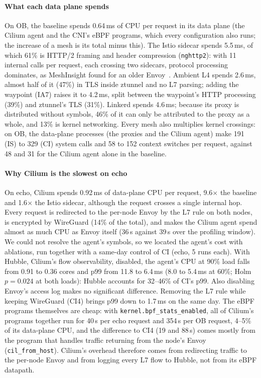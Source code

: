 \paragraph{What each data plane spends}
On OB, the baseline spends 0.64\,ms of CPU per request in its data plane (the
Cilium agent and the CNI's eBPF programs, which every configuration also
runs; the increase of a mesh is its total minus this). The Istio sidecar spends 5.5\,ms, of which 61\% is
HTTP/2 framing and header compression (\texttt{nghttp2}): with 11 internal
calls per request, each crossing two sidecars, protocol processing dominates,
as MeshInsight found for an older Envoy~\cite{zhu2023meshinsight}. Ambient L4
spends 2.6\,ms, almost half of it (47\%) in TLS inside ztunnel and no L7
parsing; adding the waypoint (IA7) raises it to 4.2\,ms, split between the
waypoint's HTTP processing (39\%) and ztunnel's TLS (31\%). Linkerd spends
4.6\,ms; because its proxy is distributed without symbols, 46\% of it can only
be attributed to the proxy as a whole, and 13\% is kernel networking. Every
mesh also multiplies kernel crossings: on OB, the data-plane processes (the
proxies and the Cilium agent) make 191 (IS) to 329 (CI) system calls and 58 to
152 context switches per request, against 48 and 31 for the Cilium agent alone
in the baseline.

\paragraph{Why Cilium is the slowest on echo}
On echo, Cilium spends 0.92\,ms of data-plane CPU per request, 9.6$\times$ the
baseline and 1.6$\times$ the Istio sidecar, although the request crosses a
single internal hop. Every request is redirected to the per-node Envoy by the
L7 rule on both nodes, is encrypted by WireGuard (14\% of the total), and makes
the Cilium agent spend almost as much CPU as Envoy itself (36\,s against 39\,s
over the profiling window). We could not resolve the agent's symbols, so
we located the agent's cost with ablations, run together with a same-day
control of CI (echo, 5 runs each). With Hubble, Cilium's flow observability,
disabled, the agent's CPU at 90\% load falls from 0.91 to 0.36 cores and p99
from 11.8 to 6.4\,ms (8.0 to 5.4\,ms at 60\%; Holm $p=0.024$ at both
loads): Hubble accounts for 32--46\% of CI's p99. Also disabling Envoy's
access log makes no significant difference. Removing the L7 rule while
keeping WireGuard (CI4) brings p99 down to 1.7\,ms on the same day. The eBPF programs themselves are cheap: with
\texttt{kernel.bpf\_stats\_enabled}, all of Cilium's programs together run
for 40\,\textmu s per echo request and 354\,\textmu s per OB request, 4--5\%
of its data-plane CPU, and the difference to CI4 (19 and 88\,\textmu s) comes
mostly from the program that handles traffic returning from the node's Envoy
(\texttt{cil\_from\_host}). Cilium's overhead therefore comes from redirecting
traffic to the per-node Envoy and from logging every L7 flow to Hubble, not from
its eBPF datapath.

